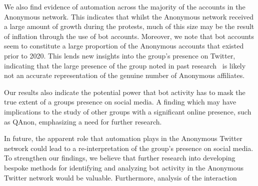 \documentclass[letterpaper]{article}
\begin{document}
We also find evidence of automation across the majority of the accounts in the Anonymous network. This indicates that whilst the Anonymous network received a large amount of growth during the protests, much of this size may be the result of inflation through the use of bot accounts. Moreover, we note that bot accounts seem to constitute a large proportion of the Anonymous accounts that existed prior to 2020. This lends new insights into the group's presence on Twitter, indicating that the large presence of the group noted in past research~\cite{Jones2020} is likely not an accurate representation of the genuine number of Anonymous affiliates.

Our results also indicate the potential power that bot activity has to mask the true extent of a groups presence on social media. A finding which may have implications to the study of other groups with a significant online presence, such as QAnon, emphasizing a need for further research.

In future, the apparent role that automation plays in the Anonymous Twitter network could lead to a re-interpretation of the group's presence on social media. To strengthen our findings, we believe that further research into developing bespoke methods for identifying and analyzing bot activity in the Anonymous Twitter network would be valuable. Furthermore, analysis of the interaction


\fontsize{9.0pt}{10.0pt}
\selectfont
%
\clearpage

\end{document}
